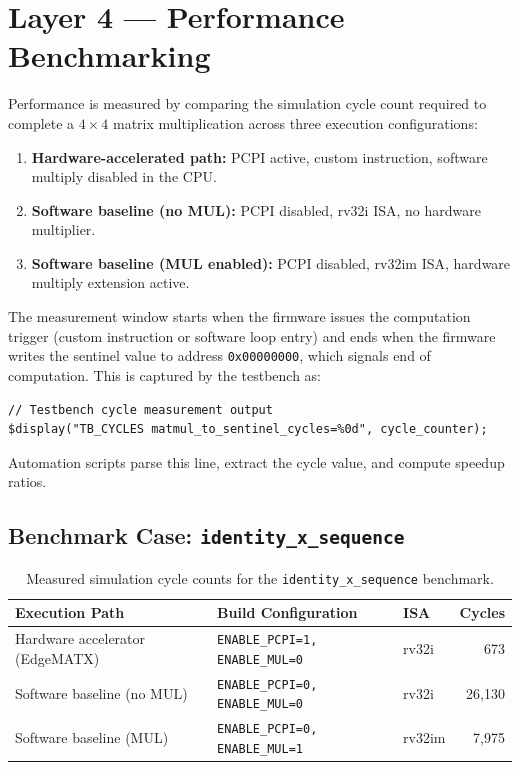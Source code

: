 ﻿\documentclass[12pt,a4paper]{report}
\renewcommand{\arraystretch}{1.2}
\begin{document}
\section{Layer 4 --- Performance Benchmarking}

Performance is measured by comparing the simulation cycle count required to complete a $4 \times 4$ matrix multiplication across three execution configurations:

\begin{enumerate}
    \item \textbf{Hardware-accelerated path:} PCPI active, custom instruction, software multiply disabled in the CPU.
    \item \textbf{Software baseline (no MUL):} PCPI disabled, rv32i ISA, no hardware multiplier.
    \item \textbf{Software baseline (MUL enabled):} PCPI disabled, rv32im ISA, hardware multiply extension active.
\end{enumerate}

The measurement window starts when the firmware issues the computation trigger (custom instruction or software loop entry) and ends when the firmware writes the sentinel value to address \texttt{0x00000000}, which signals end of computation.
This is captured by the testbench as:

\begin{lstlisting}[language={}]
// Testbench cycle measurement output
$display("TB_CYCLES matmul_to_sentinel_cycles=%0d", cycle_counter);
\end{lstlisting}

Automation scripts parse this line, extract the cycle value, and compute speedup ratios.

\subsection{Benchmark Case: \texttt{identity\_x\_sequence}}

\begin{table}[H]
\centering
\small
\setlength{\tabcolsep}{5pt}
\renewcommand{\arraystretch}{1.4}
\begin{tabular}{p{}p{}p{}r}
\toprule
\textbf{Execution Path} & \textbf{Build Configuration} & \textbf{ISA} & \textbf{Cycles} \\
\midrule
Hardware accelerator (EdgeMATX)  & \texttt{ENABLE\_PCPI=1, ENABLE\_MUL=0} & rv32i  &    673 \\
Software baseline (no MUL)  & \texttt{ENABLE\_PCPI=0, ENABLE\_MUL=0} & rv32i  & 26{,}130 \\
Software baseline (MUL)     & \texttt{ENABLE\_PCPI=0, ENABLE\_MUL=1} & rv32im &  7{,}975 \\
\bottomrule
\end{tabular}
\caption{Measured simulation cycle counts for the \texttt{identity\_x\_sequence} benchmark.}
\label{tab:cycle_comparison}
\end{table}
\end{document}
